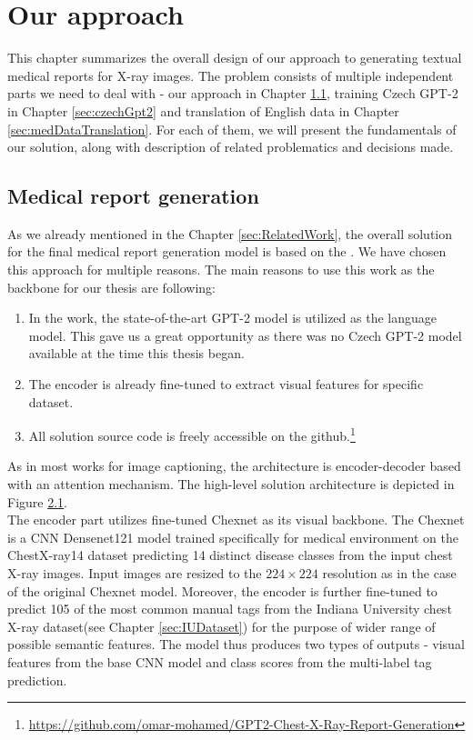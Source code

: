 \chapter{Our approach}
This chapter summarizes the overall design of our approach to generating textual medical reports for X-ray images. The problem consists of multiple independent parts we need to deal with - our approach in Chapter \ref{sec:ourApproach}, training Czech GPT-2 in Chapter \ref{sec:czechGpt2} and translation of English data in Chapter \ref{sec:medDataTranslation}. For each of them, we will present the fundamentals of our solution, along with description of related problematics and decisions made.

\section{Medical report generation}
\label{sec:ourApproach}
As we already mentioned in the Chapter \ref{sec:RelatedWork}, the overall solution for the final medical report generation model is based on the \citet{alfarghaly2021automated}. We have chosen this approach for multiple reasons. The main reasons to use this work as the backbone for our thesis are following:
\begin{enumerate}
	\item In the work, the state-of-the-art GPT-2 model is utilized as the language model. This gave us a great opportunity as there was no Czech GPT-2 model available at the time this thesis began.
	\item The encoder is already fine-tuned to extract visual features for specific dataset.
	\item All solution source code is freely accessible on the github.\footnote[1]{\url{https://github.com/omar-mohamed/GPT2-Chest-X-Ray-Report-Generation}}
\end{enumerate}

As in most works for image captioning, the architecture is encoder-decoder based with an attention mechanism. The high-level solution architecture is depicted in Figure \hyperref[fig01:OmarArchitecutre]{2.1}.\\

The encoder part utilizes fine-tuned Chexnet\citep{rajpurkar2017chexnet} as its visual backbone. The Chexnet is a CNN Densenet121 model trained specifically for medical environment on the ChestX-ray14\citep{wang2017chestx} dataset predicting 14 distinct disease classes from the input chest X-ray images. Input images are resized to the $224 \times 224$ resolution as in the case of the original Chexnet model. Moreover, the encoder is further fine-tuned to predict 105 of the most common manual tags from the Indiana University chest X-ray dataset(see Chapter \ref{sec:IUDataset}) for the purpose of wider range of possible semantic features. The model thus produces two types of outputs - visual features from the base CNN model and class scores from the multi-label tag prediction.\\

